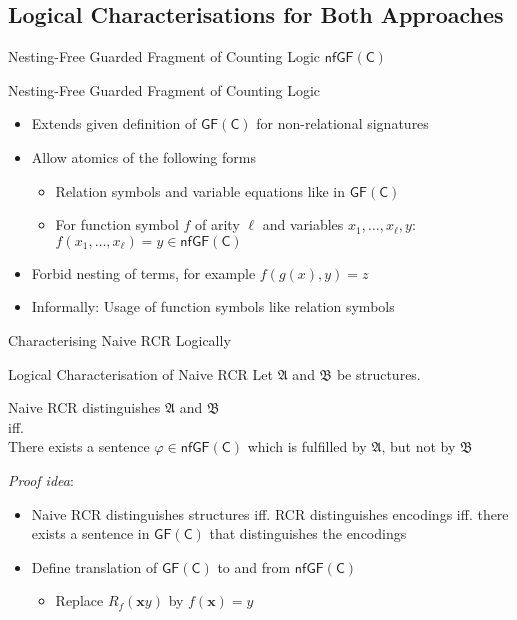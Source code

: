 \documentclass[aspectratio=169]{beamer}
\newcommand{\GFC}{\mathsf{GF}(\mathsf{C})}
\renewcommand{\phi}{\varphi}
\begin{document}
	\subsection{Logical Characterisations for Both Approaches}
	
	\begin{frame}{Nesting-Free Guarded Fragment of Counting Logic $\mathsf{nfGF}(\mathsf C)$}
		\begin{block}{Nesting-Free Guarded Fragment of Counting Logic}
			\begin{itemize}
				\item Extends given definition of $\GFC$ for non-relational signatures
				\item Allow atomics of the following forms
				\begin{itemize}
					\item Relation symbols and variable equations like in $\GFC$
					\item For function symbol $f$ of arity $\ell$ and variables $x_1,\dots,x_\ell,y$: $f(x_1,\dots,x_\ell)=y\in \mathsf{nfGF}(\mathsf C)$
				\end{itemize}
			\end{itemize}
		\end{block}
		\begin{itemize}
			\item Forbid nesting of terms, for example $f(g(x),y)=z$
			\item Informally: Usage of function symbols like relation symbols
		\end{itemize}
	\end{frame}
	
	\begin{frame}{Characterising Naive RCR Logically}
		\begin{block}{Logical Characterisation of Naive RCR}
			Let $\mathfrak A$ and $\mathfrak B$ be structures.
			\begin{center}
				Naive RCR distinguishes $\mathfrak A$ and $\mathfrak B$\\
				iff.\\
				There exists a sentence $\phi\in\mathsf{nfGF}(\mathsf C)$ which is fulfilled by $\mathfrak A$, but not by $\mathfrak B$
			\end{center}
		\end{block}
		\emph{Proof idea}:
		\begin{itemize}
			\item Naive RCR distinguishes structures iff. RCR distinguishes encodings iff. there exists a sentence in $\GFC$ that distinguishes the encodings
			\item Define translation of $\GFC$ to and from $\mathsf{nfGF}(\mathsf C)$
			\begin{itemize}
				\item Replace $R_f(\mathbf xy)$ by $f(\mathbf x)=y$
			\end{itemize}
		\end{itemize}
	\end{frame}
	
\end{document}
